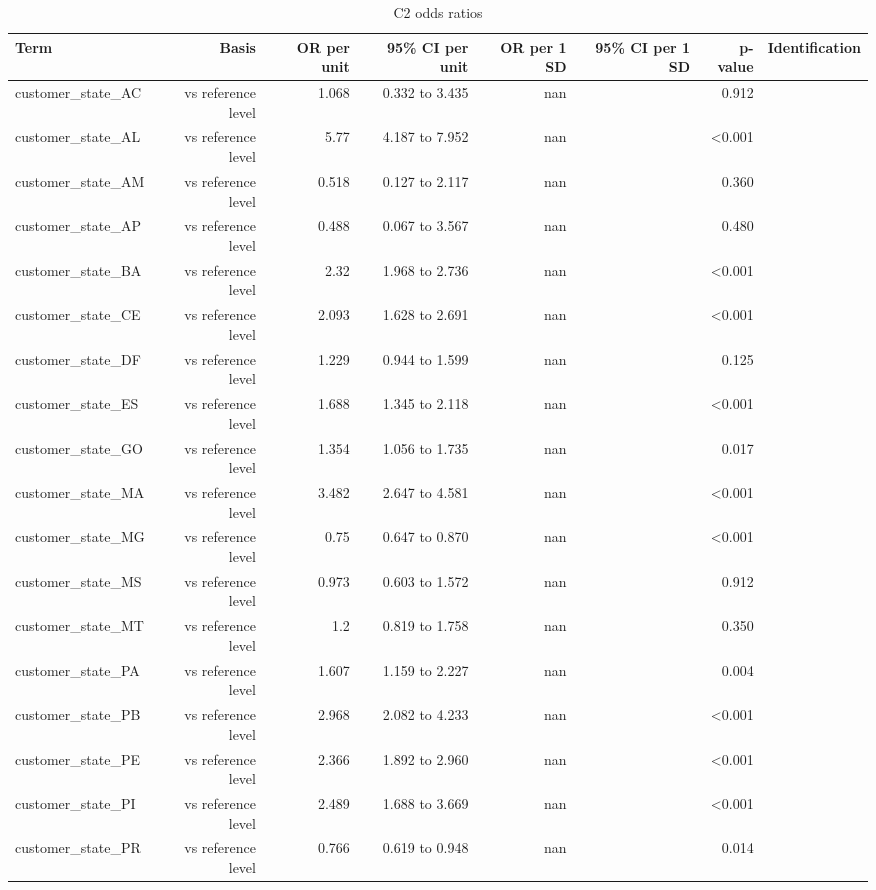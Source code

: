 \begin{table}[htbp]
\centering
\small
\caption{C2 odds ratios}
\begin{tabular}{lrrrrrrr}
\toprule
Term & Basis & OR per unit & 95\% CI per unit & OR per 1 SD & 95\% CI per 1 SD & p-value & Identification \\
\midrule
customer\_state\_AC & vs reference level & 1.068 & 0.332 to 3.435 & nan &  & 0.912 &  \\
customer\_state\_AL & vs reference level & 5.77 & 4.187 to 7.952 & nan &  & <0.001 &  \\
customer\_state\_AM & vs reference level & 0.518 & 0.127 to 2.117 & nan &  & 0.360 &  \\
customer\_state\_AP & vs reference level & 0.488 & 0.067 to 3.567 & nan &  & 0.480 &  \\
customer\_state\_BA & vs reference level & 2.32 & 1.968 to 2.736 & nan &  & <0.001 &  \\
customer\_state\_CE & vs reference level & 2.093 & 1.628 to 2.691 & nan &  & <0.001 &  \\
customer\_state\_DF & vs reference level & 1.229 & 0.944 to 1.599 & nan &  & 0.125 &  \\
customer\_state\_ES & vs reference level & 1.688 & 1.345 to 2.118 & nan &  & <0.001 &  \\
customer\_state\_GO & vs reference level & 1.354 & 1.056 to 1.735 & nan &  & 0.017 &  \\
customer\_state\_MA & vs reference level & 3.482 & 2.647 to 4.581 & nan &  & <0.001 &  \\
customer\_state\_MG & vs reference level & 0.75 & 0.647 to 0.870 & nan &  & <0.001 &  \\
customer\_state\_MS & vs reference level & 0.973 & 0.603 to 1.572 & nan &  & 0.912 &  \\
customer\_state\_MT & vs reference level & 1.2 & 0.819 to 1.758 & nan &  & 0.350 &  \\
customer\_state\_PA & vs reference level & 1.607 & 1.159 to 2.227 & nan &  & 0.004 &  \\
customer\_state\_PB & vs reference level & 2.968 & 2.082 to 4.233 & nan &  & <0.001 &  \\
customer\_state\_PE & vs reference level & 2.366 & 1.892 to 2.960 & nan &  & <0.001 &  \\
customer\_state\_PI & vs reference level & 2.489 & 1.688 to 3.669 & nan &  & <0.001 &  \\
customer\_state\_PR & vs reference level & 0.766 & 0.619 to 0.948 & nan &  & 0.014 &  \\

\end{tabular}
\end{table}
